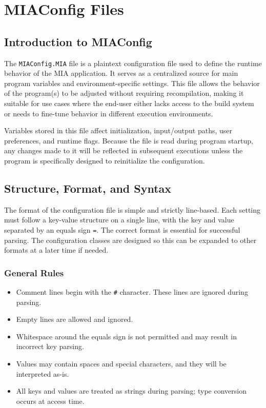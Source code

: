 \chapter{MIAConfig Files} \label{chap:MIAConfig}
\pagestyle{fancy}

\lstset{language=Python}

\section{Introduction to MIAConfig}

The \texttt{MIAConfig.MIA} file is a plaintext configuration file used to define the runtime behavior of the MIA application. It serves as a centralized source for main program variables and environment-specific settings. This file allows the behavior of the program(s) to be adjusted without requiring recompilation, making it suitable for use cases where the end-user either lacks access to the build system or needs to fine-tune behavior in different execution environments.

Variables stored in this file affect initialization, input/output paths, user preferences, and runtime flags. Because the file is read during program startup, any changes made to it will be reflected in subsequent executions unless the program is specifically designed to reinitialize the configuration.

\section{Structure, Format, and Syntax}

The format of the configuration file is simple and strictly line-based. Each setting must follow a key-value structure on a single line, with the key and value separated by an equals sign \texttt{=}. The correct format is essential for successful parsing. The configuration classes are designed so this can be expanded to other formats at a later time if needed.

\subsection*{General Rules}

\begin{itemize}
	\item Comment lines begin with the \texttt{\#} character. These lines are ignored during parsing.
	\item Empty lines are allowed and ignored.
	\item Whitespace around the equals sign is not permitted and may result in incorrect key parsing.
	\item Values may contain spaces and special characters, and they will be interpreted as-is.
	\item All keys and values are treated as strings during parsing; type conversion occurs at access time.
\end{itemize}


